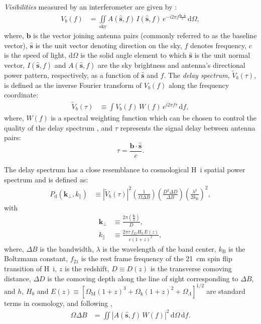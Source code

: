 \documentclass[preprint2,iop,numberedappendix,twocolappendix,appendixfloats]{emulateapj}
\newcommand{\dif}{\mathrm{d}}
\begin{document}
{\it Visibilities} measured by an interferometer are given by \citep{van34,zer38,tho01}:
\begin{align}\label{eqn:obsvis}
  V_b(f) &= \iint\limits_\textrm{sky} A(\hat{\boldsymbol{s}},f)\,I(\hat{\boldsymbol{s}},f)\,e^{-i2\pi f\frac{\boldsymbol{b}\cdot\hat{\boldsymbol{s}}}{c}}\,\dif\Omega,
\end{align}
where, $\boldsymbol{b}$ is the vector joining antenna pairs (commonly referred to as the baseline vector), $\hat{\boldsymbol{s}}$ is the unit vector denoting direction on the sky, $f$ denotes frequency, $c$ is the speed of light, $\dif\Omega$ is the solid angle element to which $\hat{\boldsymbol{s}}$ is the unit normal vector, $I(\hat{\boldsymbol{s}},f)$ and $A(\hat{\boldsymbol{s}},f)$ are the sky brightness and antenna's directional power pattern, respectively, as a function of $\hat{\boldsymbol{s}}$ and $f$. The {\it delay spectrum}, $\tilde{V}_b(\tau)$, is defined as the inverse Fourier transform of $V_b(f)$ along the frequency coordinate:
\begin{align}\label{eqn:delay-transform}
  \tilde{V}_b(\tau) &\equiv \int V_b(f)\,W(f)\,e^{i2\pi f\tau}\,\dif f,
\end{align}
where, $W(f)$ is a spectral weighting function which can be chosen to control the quality of the delay spectrum \citep{ved12,thy13}, and $\tau$ represents the signal delay between antenna pairs:
\begin{equation}\label{eqn:delay}
  \tau = \frac{\boldsymbol{b}\cdot\hat{\boldsymbol{s}}}{c}.
\end{equation}

The delay spectrum has a close resemblance to cosmological H~{\sc i} spatial power spectrum and is defined as:
\begin{align}\label{eqn:delay-power-spectrum}
  P_\textrm{d}(\boldsymbol{k}_\perp,k_\parallel) &\equiv |\tilde{V}_b(\tau)|^2\left(\frac{1}{\Omega\Delta B}\right)\left(\frac{D^2\Delta D}{\Delta B}\right)\left(\frac{\lambda^2}{2k_\textrm{B}}\right)^2,
\end{align}
with
\begin{align}
  \boldsymbol{k}_\perp &\equiv \frac{2\pi(\frac{\boldsymbol{b}}{\lambda})}{D}, \label{eqn:kperp-baseline}\\
  k_\parallel &\equiv \frac{2\pi\tau\,f_{21}H_0\,E(z)}{c(1+z)^2}, \label{eqn:kprll-delay}
\end{align}
where, $\Delta B$ is the bandwidth, $\lambda$ is the wavelength of the band center, $k_\textrm{B}$ is the Boltzmann constant, $f_{21}$ is the rest frame frequency of the 21~cm spin flip transition of H~{\sc i}, $z$ is the redshift, $D\equiv D(z)$ is the transverse comoving distance, $\Delta D$ is the comoving depth along the line of sight corresponding to $\Delta B$, and $h$, $H_0$ and $E(z)\equiv [\Omega_\textrm{M}(1+z)^3+\Omega_\textrm{k}(1+z)^2+\Omega_\Lambda]^{1/2}$ are standard terms in cosmology, and following \citet{par14},
\begin{align}
  \Omega\Delta B &= \iint \left|A(\hat{\boldsymbol{s}},f)\,W(f)\right|^2\,\dif\Omega\,\dif f.
\end{align}
\end{document}
